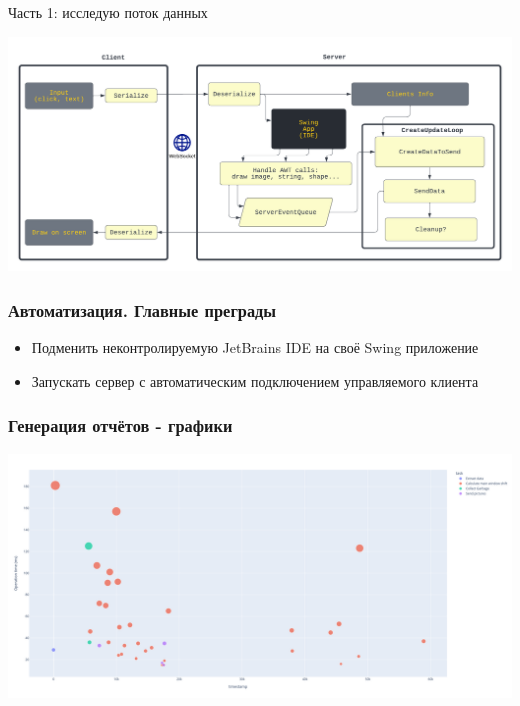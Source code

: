 \documentclass[14pt,aspectratio=169,hyperref={pdftex,unicode},xcolor=dvipsnames]{beamer}
\begin{document}
\begin{frame}{Часть 1: исследую поток данных}
  \begin{center}
    \includegraphics[width=14cm]{images/ProjectorFlowchartBetter.png}
  \end{center}
\end{frame}



\begin{frame}
  \frametitle{Автоматизация. Главные преграды}
  \begin{itemize}
    \item Подменить неконтролируемую JetBrains IDE на своё Swing приложение
    \item Запускать сервер с автоматическим подключением управляемого клиента
  \end{itemize}
\end{frame}


\begin{frame}
\frametitle{Генерация отчётов - графики}
\begin{center}
  \includegraphics[width=14cm]{images/createUpdateThreshold.png}
\end{center}
\end{frame}
\end{document}
